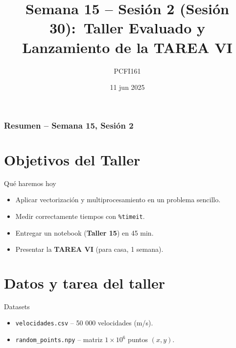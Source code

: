 \documentclass[10pt]{beamer}
\title{Semana 15 -- Sesión 2 (Sesión 30):\
Taller Evaluado y Lanzamiento de la TAREA VI}
\author{PCFI161}
\date{11 jun 2025}
\begin{document}
\myfront{}
\begin{frame}\titlepage\end{frame}

\begin{frame}\frametitle{Resumen -- Semana 15, Sesión 2}\tableofcontents\end{frame}
\metroset{block=fill}

\section{Objetivos del Taller}
\begin{frame}{Qué haremos hoy}
\begin{itemize}
  \item Aplicar vectorización y multiprocesamiento en un problema sencillo.  
  \item Medir correctamente tiempos con \texttt{\%timeit}.  
  \item Entregar un notebook (\textbf{Taller 15}) en 45 min.  
  \item Presentar la \textbf{TAREA VI} (para casa, 1 semana).  
\end{itemize}
\end{frame}

\section{Datos y tarea del taller}
\begin{frame}{Datasets}
\begin{itemize}
  \item \texttt{velocidades.csv} -- 50 000 velocidades (m/s).  
  \item \texttt{random\_points.npy} -- matriz \(1\times10^6\) puntos \((x,y)\).  
\end{itemize}
\end{frame}
\end{document}
